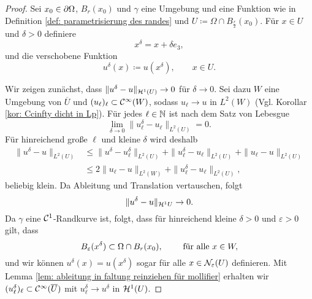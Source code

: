 \begin{proof}
	Sei \(x_0\in\partial\Omega\), \(B_r(x_0)\) und \(\gamma\) eine Umgebung und eine Funktion wie in Definition \ref{def: parametrisierung des randes} und \(U\coloneqq\Omega\cap B_{\frac{r}{2}}(x_0)\). Für \(x\in U\) und \(\delta>0\) definiere
	\begin{equation*}
		x^\delta=x+\delta e_3,
	\end{equation*}
	und die verschobene Funktion
	\begin{equation*}
		u^\delta(x)\coloneqq u(x^\delta),\qquad x\in U.
	\end{equation*}\vspace{25mm}

	Wir zeigen zunächst, dass \(\|u^\delta-u\|_{\mathcal{H}^1(U)}\to 0\) für \(\delta\to 0\). Sei dazu \(W\) eine Umgebung von \(\overline{U}\) und \((u_\ell)_\ell\subset\mathcal{C}^\infty(W)\), sodass \(u_\ell\to u\) in \(L^2(W)\) (Vgl. Korollar \ref{kor: Ccinfty dicht in Lp}). Für jedes \(\ell\in\mathbb{N}\) ist nach dem Satz von Lebesgue
	\begin{equation*}
		\lim_{\delta\to0}\|u_\ell^\delta-u_\ell\|_{L^2(U)}=0.
	\end{equation*}
	Für hinreichend große \(\ell\) und kleine \(\delta\) wird deshalb
	\begin{align*}
		\|u^\delta-u\|_{L^2(U)}
		&\leq \|u^\delta-u_\ell^\delta\|_{L^2(U)} + \|u_\ell^\delta-u_\ell\|_{L^2(U)} + \|u_\ell-u\|_{L^2(U)}\\
		&\leq 2\|u_\ell-u\|_{L^2(W)} + \|u_\ell^\delta-u_\ell\|_{L^2(U)},
	\end{align*}
	beliebig klein. Da Ableitung und Translation vertauschen, folgt
	\begin{equation*}
		\|u^\delta-u\|_{\mathcal{H}^1 U}\to0.
	\end{equation*}
	Da \(\gamma\) eine \(\mathcal{C}^1\)-Randkurve ist, folgt, dass für hinreichend kleine \(\delta>0\) und \(\varepsilon>0\) gilt, dass
	\begin{equation*}
		B_\varepsilon(x^\delta)\subset\Omega\cap B_r(x_0),\qquad\text{ für alle }x\in W,
	\end{equation*}
	und wir können \(u^\delta(x)=u(x^\delta)\) sogar für alle \(x\in\mathcal{N}_\varepsilon(U)\) definieren. Mit Lemma \ref{lem: ableitung in faltung reinziehen für mollifier} erhalten wir \((u_\ell^\delta)_\ell\subset\mathcal{C}^\infty(\overline{U})\) mit \(u_\ell^\delta\to u^\delta\) in \(\mathcal{H}^1(U)\).\vspace{1.5mm}
	

\end{proof}

